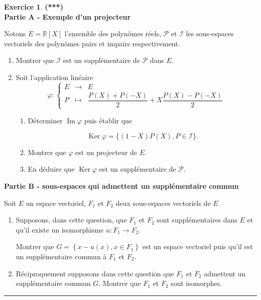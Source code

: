 \documentclass[a4paper,11pt]{article}
\theoremstyle{definition}
\newtheorem{exo}{Exercice} %
\begin{document}
\begin{exo}\textbf{(***)}\quad\\[0.25cm]
\noindent\textbf{ Partie A - Exemple d'un projecteur}
 
 Notons $E=\mathbb{R}[X]$ l'ensemble des polynômes réels, $\mathscr{P}$ et $\mathscr{I}$ les sous-espaces vectoriels des polynômes pairs et impairs respectivement.
 \begin{enumerate}
 	\item Montrer que $\mathscr{I}$ est un supplémentaire de $\mathscr{P}$ dans $E$.
 	\item   Soit l'application linéaire
 	$$\varphi : \left\{\begin{array}{ccl}
 	E &\longrightarrow & E\\
 	P &\longmapsto & \dfrac{P(X)+P(-X)}{2} + X\dfrac{P(X)-P(-X)}{2}
 	\end{array}\right.$$
 	\begin{enumerate}
 		\item Déterminer $\operatorname{Im} \varphi$ puis établir que
 		
 		$$
 		\operatorname{Ker} \varphi=\{(1-X) P(X), P \in \mathscr{I}\} .
 		$$
 		\item  Montrer que $\varphi$ est un projecteur de $E$.
 		\item En déduire que $\operatorname{Ker} \varphi$ est un supplémentaire de $\mathscr{P}$.
 	\end{enumerate}
 
 \end{enumerate}
 
\noindent\textbf{Partie B - sous-espaces qui admettent un supplémentaire commun}
 
 Soit $E$ un espace vectoriel, $F_{1}$ et $F_{2}$ deux sous-espaces vectoriels de $E$
 
 \begin{enumerate}
 	\item Supposons, dans cette question, que $F_{1}$ et $F_{2}$ sont supplémentaires dans $E$ et qu'il existe un isomorphisme $u: F_{1} \rightarrow F_{2}$.
 	
 	Montrer que $G=\left\{x-u(x), x \in F_{1}\right\}$ est un espace vectoriel puis qu'il est un supplémentaire commun à $F_{1}$ et $F_{2}$.
 	\item Réciproquement supposons dans cette question que $F_{1}$ et $F_{2}$ admettent un supplémentaire commun $G$. Montrer que $F_{1}$ et $F_{2}$ sont isomorphes.
 	
 	
 \end{enumerate}
 	\centering
	\rule{1\linewidth}{0.6pt}
\end{exo}
\end{document}
